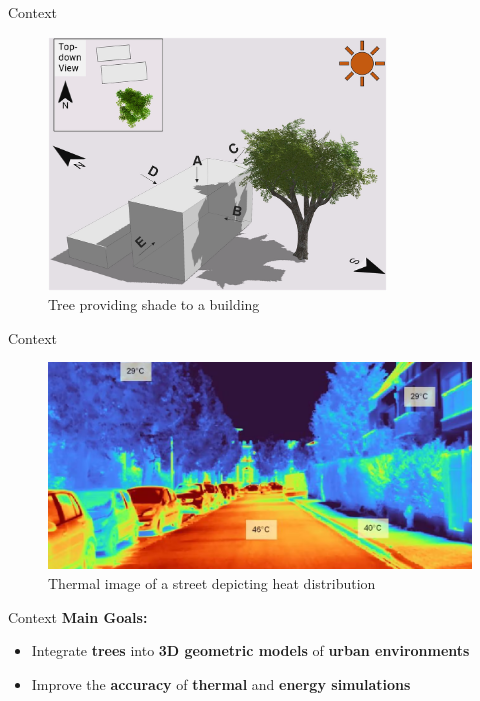 \documentclass[10pt]{beamer}
\begin{document}
\begin{frame}{Context}
  \Large
  \begin{figure}
      \centering
      \includegraphics[width=0.8\textwidth]{images/TreeShade.png}
      \caption{Tree providing shade to a building\cite{img:TreeShade}}
  \end{figure}
\end{frame}

\begin{frame}{Context}
  \Large
  \begin{figure}
      \centering
      \includegraphics[width=\textwidth]{images/heat_street.png}
      \caption{Thermal image of a street depicting heat distribution\cite{img:street_thermography}}
  \end{figure}
\end{frame}

\begin{frame}{Context}
  \Large
  \textbf{Main Goals:}
  \begin{itemize}
    \item Integrate \textbf{trees} into \textbf{3D geometric models} of \textbf{urban environments}
    \item Improve the \textbf{accuracy} of \textbf{thermal} and \textbf{energy simulations}
  \end{itemize}
\end{frame}
\end{document}
